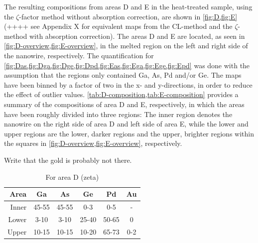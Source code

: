 The resulting compositions from areas D and E in the heat-treated sample, using the $\zeta$-factor method without absorption correction, are shown in \cref{fig:D,fig:E} (++++ see Appendix X for equivalent maps from the CL-method and the $\zeta$-method with absorption correction). The areas D and E are located, as seen in \cref{fig:D-overview,fig:E-overview}, in the melted region on the left and right side of the nanowire, respectively. The quantification for \cref{fig:Das,fig:Dga,fig:Dge,fig:Dpd,fig:Eas,fig:Ega,fig:Ege,fig:Epd} was done with the assumption that the regions only contained Ga, As, Pd and/or Ge. The maps have been binned by a factor of two in the x- and y-directions, in order to reduce the effect of outlier values. \cref{tab:D-composition,tab:E-composition} provides a summary of the compositions of area D and E, respectively, in which the areas have been roughly divided into three regions: The inner region denotes the nanowire on the right side of area D and left side of area E, while the lower and upper regions are the lower, darker regions and the upper, brighter regions within the squares in \cref{fig:D-overview,fig:E-overview}, respectively.

Write that the gold is probably not there.


\begin{table}
	\caption{For area D (zeta)}
	\begin{center}
		\begin{tabular}{r|ccccc}			
			Area & Ga & As & Ge & Pd & Au\\ 
			\midrule
			\hline
			Inner & 45-55& 45-55 & 0-3 & 0-5 & -\\
			Lower & 3-10& 3-10 & 25-40 & 50-65 & 0\\
			Upper & 10-15& 10-15 & 10-20 & 65-73 & 0-2\\
			\hline
		\end{tabular} 
	\end{center}
	\label{tab:D-composition}
\end{table}

